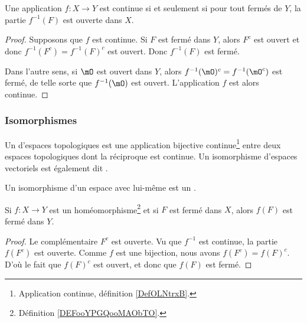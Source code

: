 \begin{lemma}       \label{LEMooATLRooEKnlro}
    Une application \( f\colon X\to Y\) est continue si et seulement si pour tout fermés de \( Y\), la partie \(f^{-1}(F) \) est ouverte dans \( X\).
\end{lemma}

\begin{proof}
    Supposons que \( f\) est continue. Si \( F\) est fermé dans \( Y\), alors \( F^c\) est ouvert et donc \( f^{-1}(F^c)=f^{-1}(F)^c\) est ouvert. Donc \( f^{-1}(F)\) est fermé.

    Dans l'autre sens, si \( \mO\) est ouvert dans \( Y\), alors \( f^{-1}(\mO)^c=f^{-1}(\mO^c)\) est fermé, de telle sorte que \( f^{-1}(\mO)\) est ouvert. L'application \( f\) est alors continue.
\end{proof}


\subsubsection{Isomorphismes}

\begin{definition}      \label{DEFooYPGQooMAObTO}
    Un  d'espaces topologiques est une application bijective continue\footnote{Application continue, définition \ref{DefOLNtrxB}.} entre deux espaces topologiques dont la réciproque est continue. Un isomorphisme d'espaces vectoriels est également dit .

	Un isomorphisme d'un espace avec lui-même est un .
\end{definition}


\begin{lemma}        \label{LEMooMJSHooOszteq}
    Si \( f\colon X\to Y\) est un homéomorphisme\footnote{Définition \ref{DEFooYPGQooMAObTO}.} et si \( F\) est fermé dans \( X\), alors \( f(F)\) est fermé dans \( Y\).
\end{lemma}

\begin{proof}
    Le complémentaire \( F^c\) est ouverte. Vu que \( f^{-1}\) est continue, la partie \( f(F^c)\) est ouverte. Comme \( f\) est une bijection, nous avons \( f(F^c)=f(F)^c\). D'où le fait que \( f(F)^c\) est ouvert, et donc que \( f(F)\) est fermé.
\end{proof}

